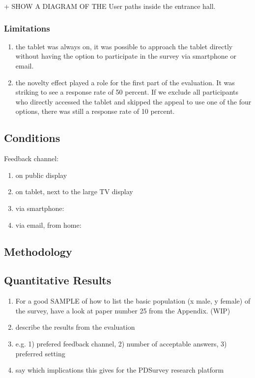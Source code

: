 	+ SHOW A DIAGRAM OF THE User paths inside the entrance hall.


	\subsubsection{Limitations}

	\begin{enumerate}
	\item the tablet was always on, it was possible to approach the tablet directly without having the option to participate in the survey via smartphone or email. 
	\item the novelty effect played a role for the first part of the evaluation. It was striking to see a response rate of 50 percent. If we exclude all participants who directly accessed the tablet and skipped the appeal to use one of the four options, there was still a response rate of 10 percent.
	\end{enumerate}



\subsection{Conditions}

	Feedback channel: 
	\begin{enumerate}
	\item on public display
	\item on tablet, next to the large TV display
	\item via smartphone: 
	\item via email, from home:
	\end{enumerate}


\subsection{Methodology}





\subsection{Quantitative Results}

	\begin{enumerate}
	\item For a good SAMPLE of how to list the basic population (x male, y female) of the survey, have a look at paper number 25 from the Appendix. (WIP)
	\item describe the results from the evaluation
	\item e.g. 1) prefered feedback channel, 2) number of acceptable answers, 3) preferred setting
	\item say which implications this gives for the PDSurvey research platform
	\end{enumerate}

